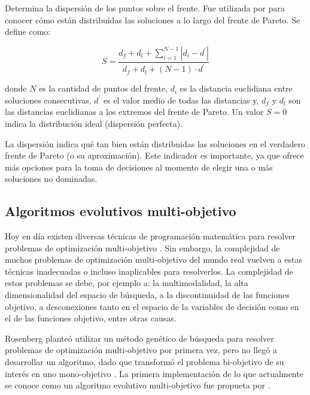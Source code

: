       \begin{definicion}
	 Determina la dispersi\'on de los puntos sobre el frente. Fue utilizada por \cite{deb02} para conocer 
	 c\'omo est\'an distribuidas las soluciones a lo largo del frente de Pareto. Se define como:
	 
	 \[S= \frac{d_f + d_l + \sum^{N-1}_{i=1}{|d_i-d^{'}|}}{d_f + d_l + \left(N -1\right)\cdot d^{'}}\]
  
      donde $N$ es la cantidad de puntos del frente, $d_i$ es la distancia euclidiana entre soluciones consecutivas, 
      $d^{'}$ es el valor medio de todas las distancias y, $d_f$ y $d_l$ son las distancias euclidianas a los extremos 
      del frente de Pareto. Un valor $S = 0$ indica la distribuci\'on ideal (dispersi\'on perfecta).
      \end{definicion}   
      
      La dispersi\'on indica qu\'e tan bien est\'an distribuidas las soluciones en el verdadero frente de Pareto (o su aproximaci\'on).
      Este indicador es importante, ya que ofrece m\'as opciones para la toma de decisiones al momento de elegir una o m\'as soluciones 
      no dominadas.
  
  \subsection{Algoritmos evolutivos multi-objetivo}

  Hoy en d\'ia existen diversas t\'ecnicas de programaci\'on matem\'atica para resolver problemas de optimizaci\'on multi-objetivo 
  \cite{Miettinen98, EASMC85}. Sin embargo, la complejidad de muchos problemas de optimizaci\'on multi-objetivo del mundo real vuelven 
  a estas t\'ecnicas inadecuadas o incluso inaplicables para resolverlos. La complejidad de estos problemas se debe, por ejemplo a: 
  la multimodalidad, la alta dimensionalidad del espacio de b\'usqueda, a la discontinuidad de las funciones objetivo, a desconexiones 
  tanto en el espacio de la variables de decisi\'on como en el de las funciones objetivo, entre otras causas.

  Rosenberg plante\'o utilizar un m\'etodo gen\'etico de b\'usqueda para resolver problemas de optimizaci\'on
  multi-objetivo por primera vez, pero no lleg\'o a desarrollar un algoritmo, dado que transform\'o el problema 
  bi-objetivo de su inter\'es en uno mono-objetivo \cite{Rosenberg67}. La primera implementaci\'on de lo que 
  actualmente se conoce como un algoritmo evolutivo multi-objetivo fue propueta por \cite{Schaffer84}. 

